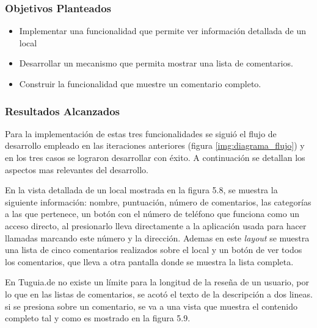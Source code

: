 \subsubsection{Objetivos Planteados} 

\begin{itemize}
\item Implementar una funcionalidad que permite ver información detallada de un local
\item Desarrollar un mecanismo que permita mostrar una lista de comentarios.
\item Construir la funcionalidad que muestre un comentario completo.
\end{itemize}

\subsubsection{Resultados Alcanzados}

Para la implementación de estas tres funcionalidades se siguió el flujo de desarrollo empleado en las iteraciones anteriores (figura \ref{img:diagrama_flujo}) y en los tres casos se lograron desarrollar con éxito. A continuación se detallan los aspectos mas relevantes del desarrollo.

En la vista detallada de un local mostrada en la figura 5.8, se muestra la siguiente información: nombre, puntuación, número de comentarios, las categorías a las que pertenece, un botón con el número de teléfono que funciona como un acceso directo, al presionarlo lleva directamente a la aplicación usada para hacer llamadas marcando este número y la dirección. Ademas en este \textit{layout} se muestra una lista de cinco comentarios realizados sobre el local y un botón de ver todos los comentarios, que lleva a otra pantalla donde se muestra la lista completa.

En Tuguia.de no existe un límite para la longitud de la reseña de un usuario, por lo que en las listas de comentarios, se acotó el texto de la descripción a dos lineas. si se presiona sobre un comentario, se va a una vista que muestra el contenido completo tal y como es mostrado en la figura 5.9.

